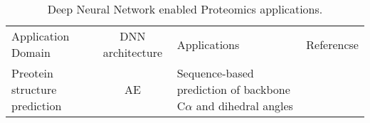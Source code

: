 \begin{table}[h!]
\centering
\begin{tabular}{|| l | c | l | l ||}
    \hline
    Application Domain & DNN architecture & Applications & Referencse \\
    Preotein structure prediction & AE & Sequence-based prediction of backbone C$\alpha$ and dihedral angles & \\
    \hline
\end{tabular}
\caption{Deep Neural Network enabled Proteomics applications.}
\label{tab:PS-DNN}
\end{table}